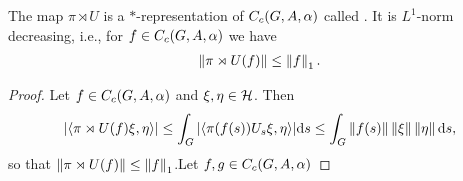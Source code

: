 \begin{lemma}
	The map $\pi \rtimes U$ is a $*$-representation of $C_c(G,A,\alpha)$ called . It is $L^1$-norm decreasing, i.e., for $f \in C_c(G,A,\alpha)$ we have
	\begin{align*}
	\left\lVert \pi \rtimes U(f)\right\rVert \leq \left\lVert f \right\rVert_1.	
	\end{align*}
\end{lemma}
\begin{proof}
	Let $f \in C_c(G,A,\alpha)$ and $\xi , \eta \in \mathcal{H}$. Then
	\begin{align*}
		|\langle \pi \rtimes U(f) \xi, \eta \rangle | \leq \int_G | \langle \pi(f(s)) U_s \xi , \eta \rangle| \mathrm{d} s \leq \int_G \left\lVert f(s)\right\rVert  \left\lVert \xi\right\rVert \left\lVert \eta \right\rVert \mathrm{d} s,
	\end{align*}
	so that $\left\lVert \pi \rtimes U(f)\right\rVert \leq \left\lVert f \right\rVert_1$.Let $f,g \in C_c(G,A,\alpha)$ 
\end{proof}




